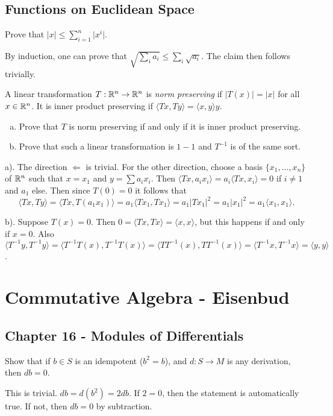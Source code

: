 \documentclass[11pt, english]{article}
\begin{document}
\subsection{Functions on Euclidean Space}

\begin{exc}[Exercise 1.1]
Prove that $\lvert x \rvert \leq \sum_{i=1}^n \lvert x^i  \rvert$.  
\end{exc}
\begin{sol}
 By induction, one can prove that $\sqrt{\sum_i a_i} \leq \sum_i \sqrt{a_i}$. The claim then follows trivially.
\end{sol}

\begin{exc}[Exercise 1.7]
A linear transformation $T:\mathbb{R}^n \to \mathbb{R}^n$ is \emph{norm preserving} if $\lvert T(x)\rvert = \lvert x \rvert$ for all $x \in \mathbb{R}^n$. It is inner product preserving if $\langle Tx,Ty \rangle = \langle x,y \rangle y$. 
\begin{enumerate}[a)]
\item Prove that $T$ is norm preserving if and only if it is inner product preserving.
\item Prove that such a linear transformation is $1-1$ and $T^{-1}$ is of the same sort.
\end{enumerate}
\end{exc}
\begin{sol}
a). The direction $\Leftarrow$ is trivial. For the other direction, choose a basis $\{x_1,\ldots,x_n\}$ of $\mathbb{R}^n$ such that $x=x_1$ and $y=\sum a_ix_i$. 
Then $\langle Tx ,a_ix_i \rangle = a_i \langle T x, x_i \rangle = 0$ if $i \neq 1$ and $a_1$ else. Then since $T(0)=0$ it follows that 
\[
\langle Tx, Ty \rangle = \langle Tx,T(a_1x_1) \rangle = a_1 \langle Tx_1,Tx_1 \rangle = a_1 \lvert Tx_1\rvert ^2 = a_1 \lvert x_1 \rvert ^2 = a_1\langle x_1,x_1 \rangle.
\]

b). Suppose $T(x)=0$. Then $0=\langle Tx,Tx \rangle = \langle x,x \rangle$, but this happens if and only if $x=0$. Also $\langle T^{-1} y,T^{-1}y \rangle = \langle T^{-1}T(x),T^{-1}T(x) \rangle = \langle TT^{-1}(x),TT^{-1}(x) \rangle = \langle T^{-1}x,T^{-1}x \rangle = \langle y,y \rangle$. 
\end{sol}

\section{Commutative Algebra - Eisenbud}

\subsection{Chapter 16 - Modules of Differentials}
\begin{exc}[Exercise 16.1]
Show that if $b \in S$ is an idempotent ($b^2=b$), and $d:S \to M$ is any derivation, then $db=0$.  
\end{exc}
\begin{sol}
This is trivial. $db=d(b^2)=2db$. If $2=0$, then the statement is automatically true. If not, then $db=0$ by subtraction. 
\end{sol}
\end{document}
